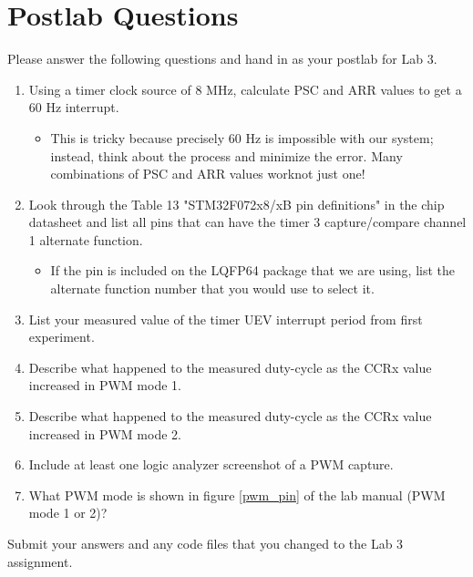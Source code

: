 \documentclass[openany,11pt,fleqn]{book} %
\begin{document}
\section{\color{blue}Postlab Questions}
\begin{question}[Postlab 3]
	Please answer the following questions and hand in as your postlab for Lab 3.
	\begin{enumerate}
		\item Using a timer clock source of 8 MHz, calculate PSC and ARR values to get a 60 Hz interrupt.
		\begin{itemize}
			\item This is tricky because precisely 60 Hz is impossible with our system; instead, think about the process and minimize the error. Many combinations of PSC and ARR values work\textemdash not just one!
		\end{itemize}
		\item Look through the Table 13 "STM32F072x8/xB pin definitions" in the chip datasheet and list all pins that can have the timer 3 capture/compare channel 1 alternate function.
		\begin{itemize}
			\item If the pin is included on the LQFP64 package that we are using, list the alternate function number that you would use to select it.
		\end{itemize}
		\item List your measured value of the timer UEV interrupt period from first experiment.
		\item Describe what happened to the measured duty-cycle as the CCRx value increased in PWM mode 1.
		\item Describe what happened to the measured duty-cycle as the CCRx value increased in PWM mode 2.
		\item Include at least one logic analyzer screenshot of a PWM capture. 
		\item What PWM mode is shown in figure \ref{pwm_pin} of the lab manual (PWM mode 1 or 2)?
	\end{enumerate}
Submit your answers and any code files that you changed to the Lab 3 assignment.
\end{question}
\end{document}
